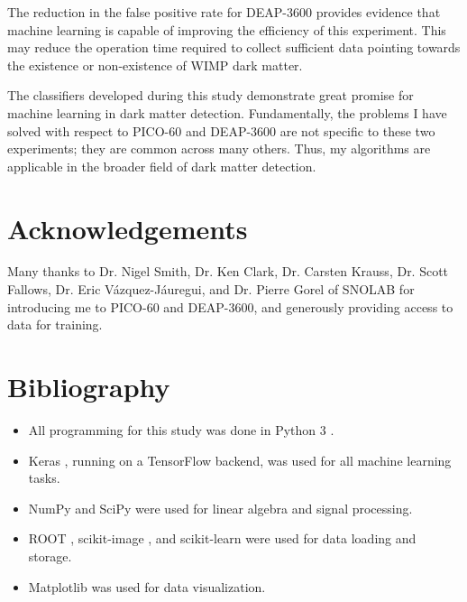 \documentclass[12pt]{article}
\begin{document}
The reduction in the false positive rate for DEAP-3600 provides evidence that machine learning is capable of improving the efficiency of this experiment. This may reduce the operation time required to collect sufficient data pointing towards the existence or non-existence of WIMP dark matter.

The classifiers developed during this study demonstrate great promise for machine learning in dark matter detection. Fundamentally, the problems I have solved with respect to PICO-60 and DEAP-3600 are not specific to these two experiments; they are common across many others. Thus, my algorithms are applicable in the broader field of dark matter detection.

\section{Acknowledgements}

Many thanks to Dr. Nigel Smith, Dr. Ken Clark, Dr. Carsten Krauss, Dr. Scott Fallows, Dr. Eric V\'azquez-J\'auregui, and Dr. Pierre Gorel of SNOLAB for introducing me to PICO-60 and DEAP-3600, and generously providing access to data for training.

\section*{Bibliography}

\begin{itemize}
    \item All programming for this study was done in Python 3 \cite{python}.
    \item Keras \cite{keras}, running on a TensorFlow \cite{tensorflow} backend, was used for all machine learning tasks.
    \item NumPy \cite{numpy} and SciPy \cite{scipy} were used for linear algebra and signal processing.
    \item ROOT \cite{root}, scikit-image \cite{scikit-image}, and scikit-learn \cite{scikit-learn} were used for data loading and storage.
    \item Matplotlib \cite{matplotlib} was used for data visualization.
\end{itemize}

\singlespacing
\printbibliography
\end{document}
